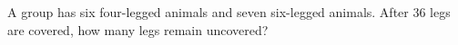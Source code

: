 A group has six four-legged animals and seven six-legged animals. After $36$ legs are covered, how many legs remain uncovered?
